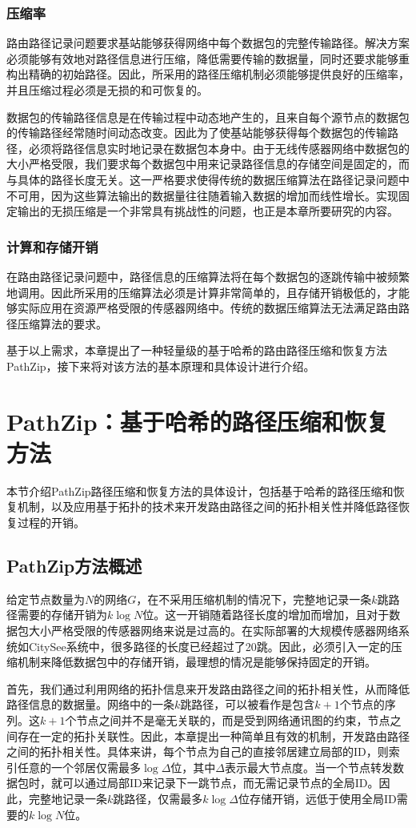 \subsubsection{压缩率}
路由路径记录问题要求基站能够获得网络中每个数据包的完整传输路径。解决方案必须能够有效地对路径信息进行压缩，降低需要传输的数据量，同时还要求能够重构出精确的初始路径。因此，所采用的路径压缩机制必须能够提供良好的压缩率，并且压缩过程必须是无损的和可恢复的。

数据包的传输路径信息是在传输过程中动态地产生的，且来自每个源节点的数据包的传输路径经常随时间动态改变。因此为了使基站能够获得每个数据包的传输路径，必须将路径信息实时地记录在数据包本身中。由于无线传感器网络中数据包的大小严格受限，我们要求每个数据包中用来记录路径信息的存储空间是固定的，而与具体的路径长度无关。这一严格要求使得传统的数据压缩算法在路径记录问题中不可用，因为这些算法输出的数据量往往随着输入数据的增加而线性增长。实现固定输出的无损压缩是一个非常具有挑战性的问题，也正是本章所要研究的内容。
\subsubsection{计算和存储开销}
在路由路径记录问题中，路径信息的压缩算法将在每个数据包的逐跳传输中被频繁地调用。因此所采用的压缩算法必须是计算非常简单的，且存储开销极低的，才能够实际应用在资源严格受限的传感器网络中。传统的数据压缩算法无法满足路由路径压缩算法的要求。

基于以上需求，本章提出了一种轻量级的基于哈希的路由路径压缩和恢复方法PathZip，接下来将对该方法的基本原理和具体设计进行介绍。
\section{PathZip：基于哈希的路径压缩和恢复方法}
本节介绍PathZip路径压缩和恢复方法的具体设计，包括基于哈希的路径压缩和恢复机制，以及应用基于拓扑的技术来开发路由路径之间的拓扑相关性并降低路径恢复过程的开销。
\subsection{PathZip方法概述}
给定节点数量为$N$的网络$G$，在不采用压缩机制的情况下，完整地记录一条$k$跳路径需要的存储开销为$k\log{N}$位。这一开销随着路径长度的增加而增加，且对于数据包大小严格受限的传感器网络来说是过高的。在实际部署的大规模传感器网络系统如CitySee系统中，很多路径的长度已经超过了20跳。因此，必须引入一定的压缩机制来降低数据包中的存储开销，最理想的情况是能够保持固定的开销。

首先，我们通过利用网络的拓扑信息来开发路由路径之间的拓扑相关性，从而降低路径信息的数据量。网络中的一条$k$跳路径，可以被看作是包含$k+1$个节点的序列。这$k+1$个节点之间并不是毫无关联的，而是受到网络通讯图的约束，节点之间存在一定的拓扑关联性。因此，本章提出一种简单且有效的机制，开发路由路径之间的拓扑相关性。具体来讲，每个节点为自己的直接邻居建立局部的ID，则索引任意的一个邻居仅需最多$\log\Delta$位，其中$\Delta$表示最大节点度。当一个节点转发数据包时，就可以通过局部ID来记录下一跳节点，而无需记录节点的全局ID。因此，完整地记录一条$k$跳路径，仅需最多$k{\log\Delta}$位存储开销，远低于使用全局ID需要的$k{\log{N}}$位。

